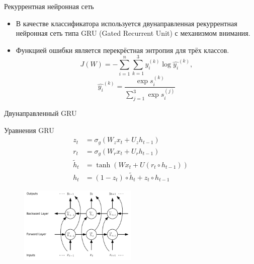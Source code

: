 \documentclass{beamer}
\begin{document}
\begin{frame}{Рекуррентная нейронная сеть}
	\begin{itemize}
	\item В качестве классификатора используется двунаправленная рекуррентная нейронная сеть типа GRU (Gated Recurrent Unit) с механизмом внимания.\\
	\item Функцией ошибки является перекрёстная энтропия для трёх классов.\\
	$$ J(W)=-\sum_{i=1}^{n}\sum_{k=1}^{3}y_{i}^{(k)}\log{\hat{y_{i}}^{(k)}},
	$$$$
	\hat{y_{i}}^{(k)} = \frac{\exp{s_{i}^{(k)}}}{\sum_{j=1}^{3}\exp{s_{i}^{(j)}}}
	$$
	\end{itemize}

\end{frame}
\begin{frame}{Двунаправленный GRU}
	\begin{block}{Уравнения GRU}
	\begin{align}
	z_{t}&=\sigma_{g}(W_{z}x_{t}+U_{z}h_{t-1})\\
	r_{t}&=\sigma_{g}(W_{r}x_{t}+U_{r}h_{t-1})\\
	\tilde{h}_{t}&=\tanh(Wx_{t}+U(r_{t}\circ h_{t-1}))\\
	h_{t}&=(1-z_{t})\circ \tilde{h}_{t}+z_{t}\circ h_{t-1}
	\end{align}	

	\end{block}
\begin{figure}[!h]
  \includegraphics[width=0.5\textwidth]{images/birnn.png}
\end{figure}
\end{frame}
\end{document}
